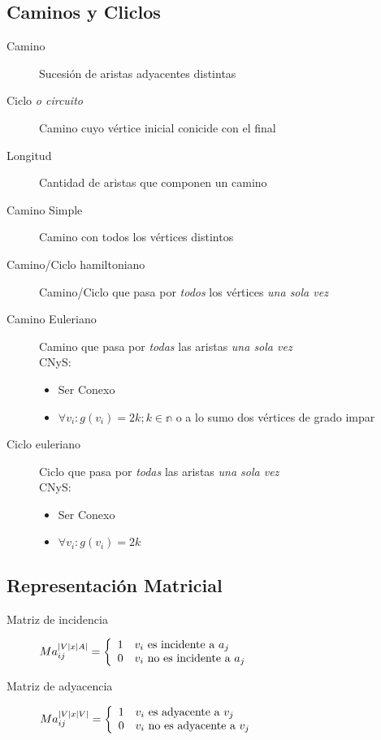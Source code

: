 \documentclass[a4paper]{article}
\numberwithin{equation}{section}
\numberwithin{figure}{section}
\numberwithin{table}{section}
\newcommand{\refa}[1]{}
\begin{document}
\subsection{Caminos y Cliclos}
\begin{description}
	\item[Camino]\label{camino} Sucesi\'on de aristas adyacentes\refa{adyacente} distintas
    \item[Ciclo \emph{o circuito}]\label{ciclo} Camino\refa{camino} cuyo v\'ertice inicial conicide con el final
    \item[Longitud] Cantidad de aristas que componen un camino\refa{camino}
    \item[Camino Simple]\label{camino simple} Camino\refa{camino} con todos los v\'ertices distintos
    \item[Camino/Ciclo hamiltoniano] Camino\refa{camino}/Ciclo\refa{ciclo} que pasa por \emph{todos} los v\'ertices \emph{una sola vez}
    \item[Camino Euleriano] Camino\refa{camino} que pasa por \emph{todas} las aristas \emph{una sola vez}
    	\\ CNyS:
        	\begin{itemize}
            	\item Ser Conexo\refa{conexo}
                \item $\forall v_i : g(v_i) = 2k; k \in \mathbb{n}$ o a lo sumo dos v\'ertices de grado\refa{grado} impar
            \end{itemize}
    \item[Ciclo euleriano] Ciclo\refa{ciclo} que pasa por \emph{todas} las aristas \emph{una sola vez}
        	\\ CNyS:
        	\begin{itemize}
            	\item Ser Conexo\refa{conexo}
                \item $\forall v_i : g(v_i) = 2k$
            \end{itemize}
\end{description}

\subsection{Representaci\'on Matricial}
\begin{description}
	\item[Matriz de incidencia] $Ma_{ij}^{|V|x|A|} = \left\{
\begin{array}{c l}
 1 & v_i\textup{ es incidente\refa{incidente} a } a_j\\
 0 & v_i\textup{ no es incidente\refa{incidente} a } a_j\\
\end{array}
\right.
$
    \item[Matriz de adyacencia]$Ma_{ij}^{|V|x|V|} = \left\{
\begin{array}{c l}
 1 & v_i\textup{ es adyacente\refa{adyacente} a } v_j\\
 0 & v_i\textup{ no es adyacente\refa{adyacente} a } v_j\\
\end{array}
\right.
$
\end{description}
\end{document}
